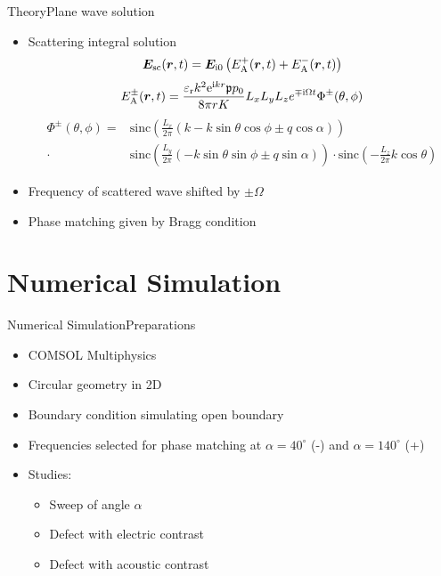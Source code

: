 \documentclass[11pt, final]{beamer}
\begin{document}
	\begin{frame}{Theory}{Plane wave solution}
		\begin{itemize}
			\item Scattering integral solution
			\small
			\begin{equation*}
				\bm{E}_{\mathrm{sc}} (\bm{r},t) = \bm{E}_{\mathrm{i}0} \left( E_{\mathrm{A}}^+ (\bm{r},t) + E_{\mathrm{A}}^- (\bm{r},t) \right)
			\end{equation*}
			\begin{equation*}
				E_{\mathrm{A}}^\pm (\bm{r},t) = \frac{\varepsilon_{\mathrm{r}}k^2 \mathrm{e}^{\mathrm{i} kr} \mathfrak{p} p_0}{8\pi r K} L_{x} L_{y} L_{z} e^{\mp \mathrm{i} \Omega t} \Phi^\pm (\theta,\phi)
			\end{equation*}
			\begin{equation*}
			\begin{split}
				\Phi^\pm(\theta,\phi) =& \text{sinc} \left( \frac{L_{x}}{2\pi} \left( k - k\sin{\theta}\cos{\phi} \pm q\cos{\alpha} \right) \right) \\
				\cdot& \text{sinc} \left( \frac{L_{y}}{2\pi} \left( -k\sin{\theta}\sin{\phi} \pm q\sin{\alpha} \right) \right)
				\cdot \text{sinc} \left( -\frac{L_{z}}{2\pi} k\cos{\theta} \right)
			\end{split}
			\end{equation*}
			\pause
			\normalsize
			\item Frequency of scattered wave shifted by $\pm \Omega$
			\item Phase matching given by Bragg condition
		\end{itemize}
	\end{frame}

	\section{Numerical Simulation}
	
	\begin{frame}{Numerical Simulation}{Preparations}
		\begin{itemize}
			\item COMSOL Multiphysics
			\pause
			\item Circular geometry in 2D
			\item Boundary condition simulating open boundary
			\pause
			\item Frequencies selected for phase matching at $\alpha = 40^\circ$ (-) and $\alpha = 140^\circ$ (+)
			\pause
			\item Studies:
			\begin{itemize}
				\item Sweep of angle $\alpha$
				\item Defect with electric contrast
				\item Defect with acoustic contrast
			\end{itemize}
		\end{itemize}
	\end{frame}
	
\end{document}
